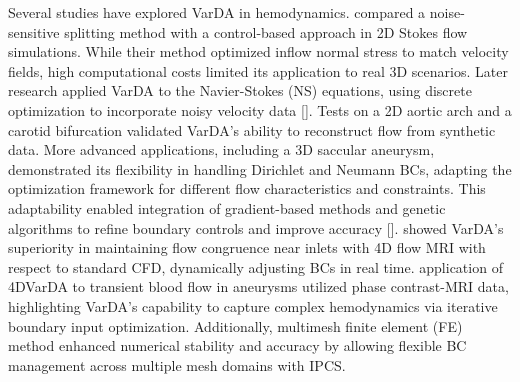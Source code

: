 Several studies have explored VarDA in hemodynamics. \cite{Delia2013} compared a noise-sensitive splitting method with a control-based approach in 2D Stokes flow simulations. While their method optimized inflow normal stress to match velocity fields, high computational costs limited its application to real 3D scenarios. Later research applied VarDA to the Navier-Stokes (NS) equations, using discrete optimization to incorporate noisy velocity data [\cite{Delia2012}]. Tests on a 2D aortic arch and a carotid bifurcation validated VarDA's ability to reconstruct flow from synthetic data. More advanced applications, including a 3D saccular aneurysm, demonstrated its flexibility in handling Dirichlet and Neumann BCs, adapting the optimization framework for different flow characteristics and constraints. This adaptability enabled integration of gradient-based methods and genetic algorithms to refine boundary controls and improve accuracy [\cite{Tiago2017}]. \cite{Koltuklouglu2018} showed VarDA's superiority in maintaining flow congruence near inlets with 4D flow MRI with respect to standard CFD, dynamically adjusting BCs in real time. \cite{Funke2019} application of 4DVarDA to transient blood flow in aneurysms utilized phase contrast-MRI data, highlighting VarDA's capability to capture complex hemodynamics via iterative boundary input optimization. Additionally, \cite{Dokken2020} multimesh finite element (FE) method enhanced numerical stability and accuracy by allowing flexible BC management across multiple mesh domains with IPCS.



